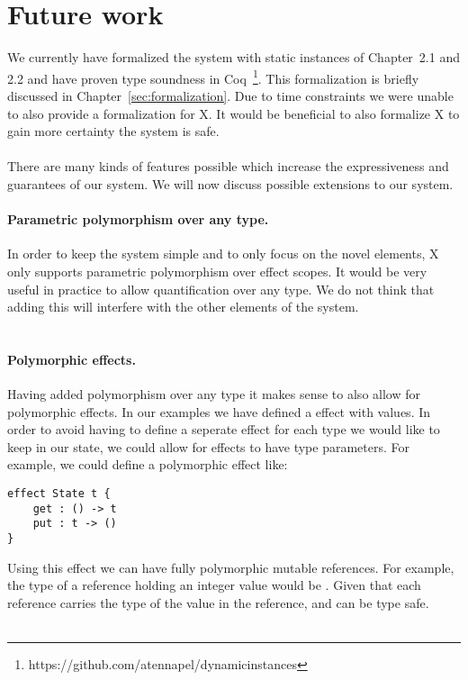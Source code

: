 \section{Future work}
We currently have formalized the system with static instances of Chapter~2.1 and 2.2 and have proven type soundness in Coq~\footnote{https://github.com/atennapel/dynamicinstances}.
This formalization is briefly discussed in Chapter~\ref{sec:formalization}.
Due to time constraints we were unable to also provide a formalization for X.
It would be beneficial to also formalize X to gain more certainty the system is safe.
\\\\
There are many kinds of features possible which increase the expressiveness and guarantees of our system.
We will now discuss possible extensions to our system.

\paragraph{Parametric polymorphism over any type.}
In order to keep the system simple and to only focus on the novel elements, X only supports parametric polymorphism over effect scopes.
It would be very useful in practice to allow quantification over any type.
We do not think that adding this will interfere with the other elements of the system.
\\\\
\paragraph{Polymorphic effects.}
Having added polymorphism over any type it makes sense to also allow for polymorphic effects.
In our examples we have defined a  effect with  values.
In order to avoid having to define a seperate effect for each type we would like to keep in our state, we could allow for effects to have type parameters.
For example, we could define a polymorphic  effect like:
\begin{verbatim}
effect State t {
	get : () -> t
	put : t -> ()
}
\end{verbatim}

Using this effect we can have fully polymorphic mutable references.
For example, the type of a reference holding an integer value would be .
Given that each reference carries the type of the value in the reference,  and  can be type safe.
\\\\
